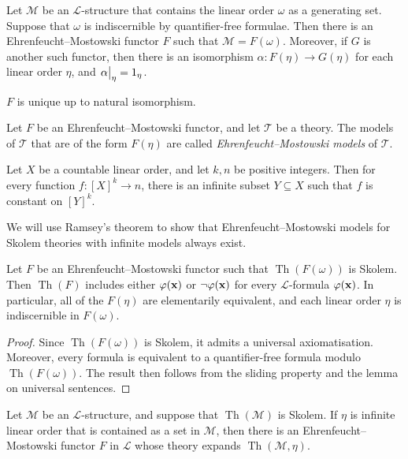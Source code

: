 \begin{lemma}
	Let \( \mathcal M \) be an \( \mathcal L \)-structure that contains the linear order \( \omega \) as a generating set.
	Suppose that \( \omega \) is indiscernible by quantifier-free formulae.
	Then there is an Ehrenfeucht--Mostowski functor \( F \) such that \( \mathcal M = F(\omega) \).
	Moreover, if \( G \) is another such functor, then there is an isomorphism \( \alpha : F(\eta) \to G(\eta) \) for each linear order \( \eta \), and \( \eval{\alpha}_\eta = 1_\eta \).
\end{lemma}
\( F \) is unique up to natural isomorphism.
\begin{definition}
	Let \( F \) be an Ehrenfeucht--Mostowski functor, and let \( \mathcal T \) be a theory.
	The models of \( \mathcal T \) that are of the form \( F(\eta) \) are called \emph{Ehrenfeucht--Mostowski models} of \( \mathcal T \).
\end{definition}
\begin{theorem}[Ramsey]
	Let \( X \) be a countable linear order, and let \( k, n \) be positive integers.
	Then for every function \( f : [X]^k \to n \), there is an infinite subset \( Y \subseteq X \) such that \( f \) is constant on \( [Y]^k \).
\end{theorem}
We will use Ramsey's theorem to show that Ehrenfeucht--Mostowski models for Skolem theories with infinite models always exist.
\begin{lemma}
	Let \( F \) be an Ehrenfeucht--Mostowski functor such that \( \operatorname{Th}(F(\omega)) \) is Skolem.
	Then \( \operatorname{Th}(F) \) includes either \( \varphi(\vb x) \) or \( \neg\varphi(\vb x) \) for every \( \mathcal L \)-formula \( \varphi(\vb x) \).
	In particular, all of the \( F(\eta) \) are elementarily equivalent, and each linear order \( \eta \) is indiscernible in \( F(\omega) \).
\end{lemma}
\begin{proof}
	Since \( \operatorname{Th}(F(\omega)) \) is Skolem, it admits a universal axiomatisation.
	Moreover, every formula is equivalent to a quantifier-free formula modulo \( \operatorname{Th}(F(\omega)) \).
	The result then follows from the sliding property and the lemma on universal sentences.
\end{proof}
\begin{theorem}
	Let \( \mathcal M \) be an \( \mathcal L \)-structure, and suppose that \( \operatorname{Th}(\mathcal M) \) is Skolem.
	If \( \eta \) is infinite linear order that is contained as a set in \( \mathcal M \), then there is an Ehrenfeucht--Mostowski functor \( F \) in \( \mathcal L \) whose theory expands \( \operatorname{Th}(\mathcal M,\eta) \).
\end{theorem}
